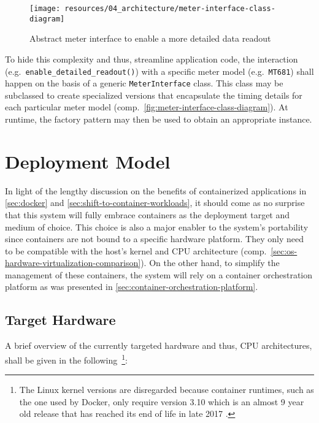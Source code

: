 \begin{figure}[hbt]
  \centering
  \texttt{[image: resources/04\_architecture/meter-interface-class-diagram]}
  \caption{Abstract meter interface to enable a more detailed data readout}
  \label{fig:meter-interface-class-diagram}
\end{figure}

\FloatBarrier

To hide this complexity and thus, streamline application code, the interaction (e.g.~\texttt{enable\_detailed\_readout()}) with a specific meter model (e.g.~\texttt{MT681}) shall happen on the basis of a generic \texttt{MeterInterface} class. This class may be subclassed to create specialized versions that encapsulate the timing details for each particular meter model (comp.~\autoref{fig:meter-interface-class-diagram}). At runtime, the factory pattern may then be used to obtain an appropriate instance.


\section{Deployment Model}
\label{sec:deployment-model}

In light of the lengthy discussion on the benefits of containerized applications in \autoref{sec:docker} and \autoref{sec:shift-to-container-workloads}, it should come as no surprise that this system will fully embrace containers as the deployment target and medium of choice. This choice is also a major enabler to the system's portability since containers are not bound to a specific hardware platform. They only need to be compatible with the host's kernel and \acs{CPU} architecture (comp.~\autoref{sec:os-hardware-virtualization-comparison}). On the other hand, to simplify the management of these containers, the system will rely on a container orchestration platform as was presented in \autoref{sec:container-orchestration-platform}.


\subsection{Target Hardware}
\label{sec:deployment-target-hardware}

A brief overview of the currently targeted hardware and thus, \acs{CPU} architectures, shall be given in the following~\footnote{The Linux kernel versions are disregarded because container runtimes, such as the one used by Docker, only require version 3.10 which is an almost 9 year old release that has reached its end of life in late 2017 \cite{dockerEngine} \cite{lkml2018eol}.}:

